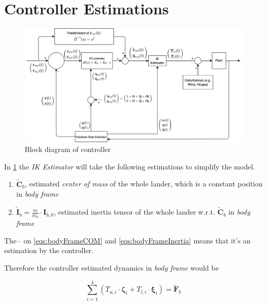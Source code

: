 \documentclass[10pt]{elsarticle}
\begin{document}
\section{Controller Estimations}

\begin{figure}[ht]
    \centering
    \includegraphics[width=.95\textwidth]{PD_feedforward_block}
    \vspace{5mm} 
    \caption{Block diagram of controller}
    \label{fig:PD_feedforward_block}
\end{figure}

In \cref{fig:PD_feedforward_block} the \textit{IK Estimator} will take the following estimations to simplify the model.
\begin{enumerate}[label=\textbf{b.\arabic*}, itemsep=2pt]
    \item \label{eqs:bodyFrameCOM} $\tilde{\boldsymbol{C}}_b$, estimated \textit{center of mass} of the whole lander, which is a constant position in \textit{body frame}
    \item \label{eqs:bodyFrameInertia} $\tilde{\boldsymbol{I}}_b = \frac{m}{m_b} \cdot \boldsymbol{I}_{b, 0}$, estimated inertia tensor of the whole lander w.r.t. $\tilde{\boldsymbol{C}}_b$ in \textit{body frame} 
\end{enumerate}

The $\, \tilde{ } \,$ on \eqref{eqs:bodyFrameCOM} and \eqref{eqs:bodyFrameInertia} means that it's an estimation by the controller.

Therefore the controller estimated dynamics in \textit{body frame} would be

\footnotesize
\begin{equation} \label{eqs:accLinear}
\sum\limits_{i=1}^{4}{(T_{u,i} \cdot \boldsymbol{\zeta}_{i} + T_{l,i} \cdot \boldsymbol{\xi}_{i})} = \tilde{\boldsymbol{F}}_b     
\end{equation}
\end{document}
